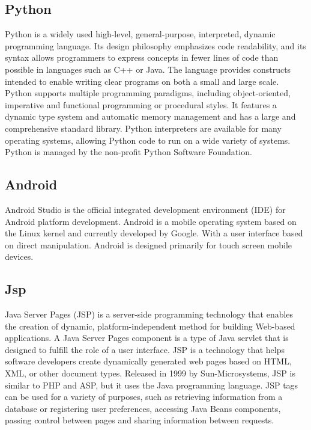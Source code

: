 \documentclass[12pt,a4paper,oneside]{report}
\begin{document}
{\subsection{Python}
\par Python is a widely used high-level, general-purpose, interpreted, dynamic programming language. Its design philosophy emphasizes code readability, and its syntax allows programmers to express concepts in fewer lines of code than possible in languages such as C++ or Java. The language provides constructs intended to enable writing clear programs on both a small and large scale. Python supports multiple programming paradigms, including object-oriented, imperative and functional programming or procedural styles. It features a dynamic type system and automatic memory management and has a large and comprehensive standard library. Python interpreters are available for many operating systems, allowing Python code to run on a wide variety of systems. Python is managed by the non-proﬁt Python Software Foundation.
\subsection{Android}
Android Studio is the official integrated development environment (IDE) for Android platform development. Android is a mobile operating system based on the Linux kernel and currently developed by Google. With a user interface based on direct manipulation. Android is designed primarily for touch screen mobile devices.\\
\subsection{Jsp}
\par Java Server Pages (JSP) is a server-side programming technology that enables the creation of dynamic, platform-independent method for building Web-based applications. A Java Server Pages component is a type of Java servlet that is designed to fulfill the role of a user interface.
JSP is a technology that helps software developers create dynamically generated web pages based on HTML, XML, or other document types. Released in 1999 by Sun-Microsystems, JSP is similar to PHP and ASP, but it uses the Java programming language. JSP tags can be used for a variety of purposes, such as retrieving information from a database or registering user preferences, accessing Java Beans components, passing control between pages and sharing information between requests.\\
}
\end{document}
